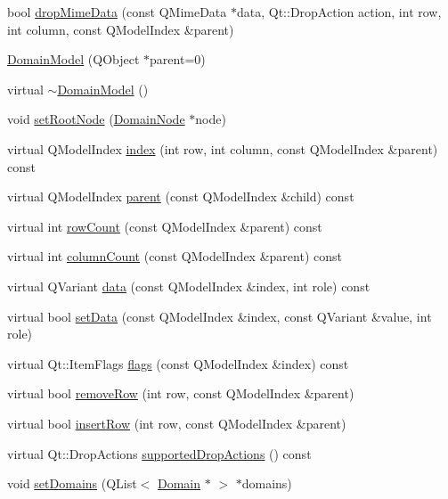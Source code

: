 \begin{DoxyCompactItemize}
\item 
bool \hyperlink{class_domain_model_a21665633939b2d605aa0749f33957b4d}{dropMimeData} (const QMimeData $\ast$data, Qt::DropAction action, int row, int column, const QModelIndex \&parent)
\item 
\hyperlink{class_domain_model_a7cdc9785bda6c89d0b87b46bfe38eb3d}{DomainModel} (QObject $\ast$parent=0)
\item 
virtual \hyperlink{class_domain_model_afd979016390d3df15a859c3342ef7127}{$\sim$DomainModel} ()
\item 
void \hyperlink{class_domain_model_aa39aa4b344dce747e660a1bba95099a4}{setRootNode} (\hyperlink{class_domain_node}{DomainNode} $\ast$node)
\item 
virtual QModelIndex \hyperlink{class_domain_model_a49ff448341c2c244f348157cb69ac13a}{index} (int row, int column, const QModelIndex \&parent) const 
\item 
virtual QModelIndex \hyperlink{class_domain_model_a1eb72b95578c4da97ed957dd1a44c230}{parent} (const QModelIndex \&child) const 
\item 
virtual int \hyperlink{class_domain_model_a5723a990a0ee842c0b8910bfa83812b3}{rowCount} (const QModelIndex \&parent) const 
\item 
virtual int \hyperlink{class_domain_model_a8ab8ec63857e51ef057d0160a74e3451}{columnCount} (const QModelIndex \&parent) const 
\item 
virtual QVariant \hyperlink{class_domain_model_a132fbb7abd4f2534894ad1676f86b9d0}{data} (const QModelIndex \&index, int role) const 
\item 
virtual bool \hyperlink{class_domain_model_a21a193d100c483df3ad313fa1d3d9ad1}{setData} (const QModelIndex \&index, const QVariant \&value, int role)
\item 
virtual Qt::ItemFlags \hyperlink{class_domain_model_a5c4995aa28819210f48a592f4209ecde}{flags} (const QModelIndex \&index) const 
\item 
virtual bool \hyperlink{class_domain_model_a3b52a74e9944aa510b6ab45ab304809e}{removeRow} (int row, const QModelIndex \&parent)
\item 
virtual bool \hyperlink{class_domain_model_ad545ab686850974ce49436f18e47c041}{insertRow} (int row, const QModelIndex \&parent)
\item 
virtual Qt::DropActions \hyperlink{class_domain_model_a15f3ae980ad9922dfcde90e0d3934338}{supportedDropActions} () const 
\item 
void \hyperlink{class_domain_model_a777f957e272990846fe488a3761ed436}{setDomains} (QList$<$ \hyperlink{class_domain}{Domain} $\ast$ $>$ $\ast$domains)

\end{DoxyCompactItemize}
